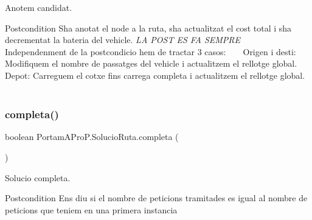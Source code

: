 Anotem candidat. 

\begin{DoxyPostcond}{Postcondition}
S\textquotesingle{}ha anotat el node a la ruta, s\textquotesingle{}ha actualitzat el cost total i s\textquotesingle{}ha decrementat la bateria del vehicle. {\itshape LA P\+O\+ST ES FA S\+E\+M\+P\+RE} ~\newline
~\newline
Independenment de la postcondicio hem de tractar 3 casos\+: ~\newline
~\newline
Origen i desti\+: Modifiquem el nombre de passatges del vehicle i actualitzem el rellotge global. ~\newline
~\newline
Depot\+: Carreguem el cotxe fins carrega completa i actualitzem el rellotge global. ~\newline

\end{DoxyPostcond}
\mbox{\label{class_portam_a_pro_p_1_1_solucio_ruta_ab949eba660c769bf69e80decac453da4}} 
\subsubsection{\texorpdfstring{completa()}{completa()}}
{\footnotesize\ttfamily boolean Portam\+A\+Pro\+P.\+Solucio\+Ruta.\+completa (\begin{DoxyParamCaption}{ }\end{DoxyParamCaption})}



Solucio completa. 

\begin{DoxyPostcond}{Postcondition}
Ens diu si el nombre de peticions tramitades es igual al nombre de peticions que teniem en una primera instancia 
\end{DoxyPostcond}
\mbox{\label{class_portam_a_pro_p_1_1_solucio_ruta_a84464a58a4c68efa9f332b94f7349c42}} 
